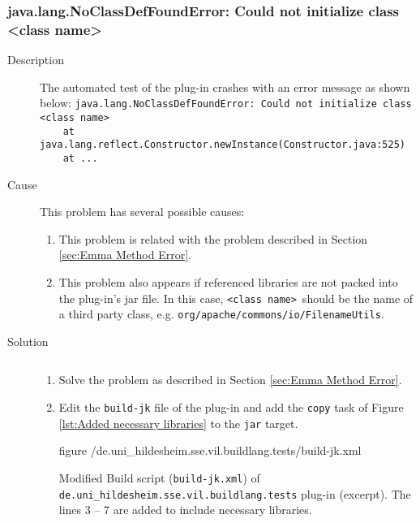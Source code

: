 \subsubsection[java.lang.NoClassDefFoundError]{java.lang.NoClassDefFoundError: Could not initialize class <class name>}
\label{sec:NoClassDefFoundError}
\begin{description}
	\item[Description] $ $\\
		The automated test of the plug-in crashes with an error message as shown below:
		\small
			\verb|java.lang.NoClassDefFoundError: Could not initialize class |\color{red}\verb|<class name>|\\
			\color{black}\verb|    at java.lang.reflect.Constructor.newInstance(Constructor.java:525)|\\
			\verb|    at ...|
		\normalsize
	\item[Cause] $ $\\
	This problem has several possible causes:	
	\begin{enumerate}
		\item This problem is related with the problem described in Section \vref{sec:Emma Method Error}.
		\item This problem also appears if referenced libraries are not packed into the plug-in's jar file. In this case, \color{red}\texttt{<class name>}\color{black}\ should be the name of a third party class, e.g. \texttt{org/apache/commons/io/FilenameUtils}.
	\end{enumerate}
	\item[Solution] $ $
	\begin{enumerate}
		\item Solve the problem as described in Section \ref{sec:Emma Method Error}.
		\item Edit the \texttt{build-jk} file of the plug-in and add the \texttt{copy} task of Figure \vref{lst:Added necessary libraries} to the \texttt{jar} target.
		\begin{nofloat}{figure}
			\centering
			 {\InstantiationHome/de.uni_hildesheim.sse.vil.buildlang.tests/build-jk.xml}
			\caption[Creation of a jar, including referenced libraries]{Modified Build script (\texttt{build-jk.xml}) of \texttt{de.uni\_hildesheim.sse.vil.build\-lang.tests} plug-in (excerpt). The lines 3 -- 7 are added to include necessary libraries.}
			\label{lst:Added necessary libraries}
\end{nofloat}
	\end{enumerate}
\end{description}
